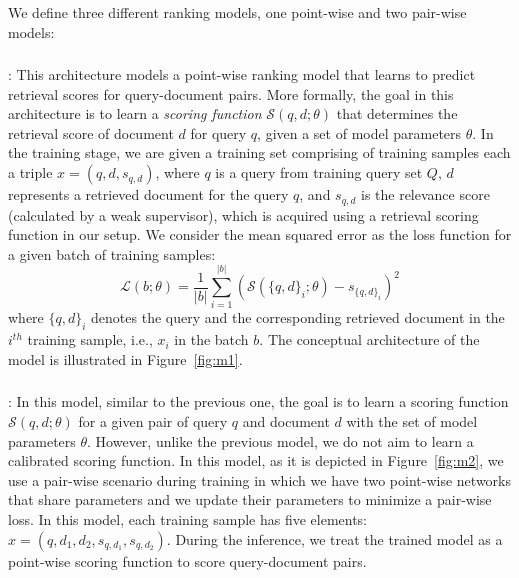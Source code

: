 We define three different ranking models, one point-wise and two pair-wise models:

\subsubsection{\label{sec:modelone}\Modelone}: This architecture models a point-wise ranking model that learns to predict retrieval scores for query-document pairs. More formally, the goal in this architecture is to learn a \emph{scoring function} $\mathcal{S}(q, d; \theta)$ that determines the retrieval score of document $d$ for query $q$, given a set of model parameters $\theta$.
%
In the training stage, we are given a training set comprising of training samples each a triple $x = (q,d, s_{q,d})$, where $q$ is a query from training query set $Q$, $d$ represents a retrieved document for the query $q$, and $s_{q,d}$ is the relevance score (calculated by a weak supervisor), which is acquired using a retrieval scoring function in our setup.
%
We consider the mean squared error as the loss function for a given batch of training samples:
\begin{equation}
\mathcal{L}(b; \theta) = \frac{1}{|b|} \sum_{i=1}^{|b|}{(\mathcal{S}(\{q, d\}_i; \theta) - s_{\{q, d\}_i})^2}
\end{equation}
where $\{q, d\}_i$ denotes the query and the corresponding retrieved document in the $i^{th}$ training sample, i.e., $x_i$ in the batch $b$.
The conceptual architecture of the model is illustrated in Figure~\ref{fig:m1}.


\subsubsection{\label{sec:modeltwo}\Modeltwo}:
In this model, similar to the previous one, the goal is to learn a scoring function $\mathcal{S}(q, d; \theta)$ for a given pair of query $q$ and document $d$ with the set of model parameters $\theta$. 
However, unlike the previous model, we do not aim to learn a calibrated scoring function. 
In this model, as it is depicted in Figure~\ref{fig:m2}, we use a pair-wise scenario during training in which we have two point-wise networks that share parameters and we update their parameters to minimize a pair-wise loss.
In this model, each training sample has five elements: $x = (q,d_1, d_2, s_{q,d_1}, s_{q,d_2})$.
During the inference, we treat the trained model as a point-wise scoring function to score query-document pairs.

